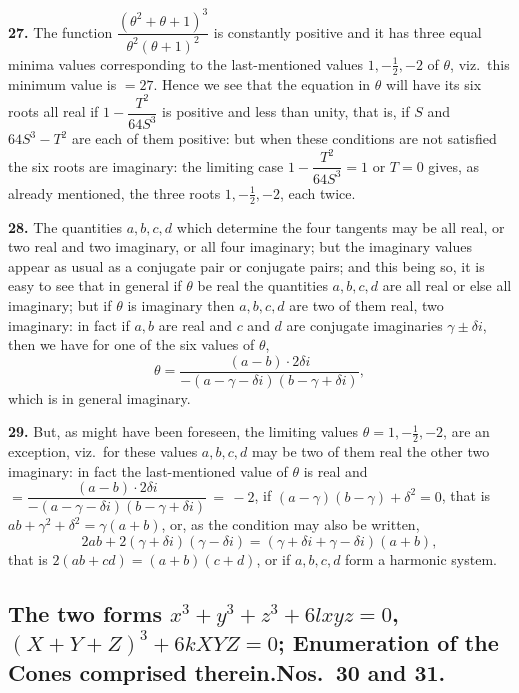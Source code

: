 \documentclass[11pt,a4paper]{article}
\begin{document}
\textbf{27.} The function $\dfrac{(\theta^{2} + \theta + 1)^{3}}{\theta^{2}(\theta + 1)^{2}}$ is constantly positive and it has three equal minima values corresponding to the last-mentioned values $1, -\tfrac{1}{2}, -2$ of $\theta$, viz.\ this minimum value is $= 27$. Hence we see that the equation in $\theta$ will have its six roots all real if $1 - \dfrac{T^{2}}{64S^{3}}$ is positive and less than unity, that is, if $S$ and $64S^{3} - T^{2}$ are each of them positive: but when these conditions are not satisfied the six roots are imaginary: the limiting case $1 - \dfrac{T^{2}}{64S^{3}} = 1$ or $T = 0$ gives, as already mentioned, the three roots $1, -\tfrac{1}{2}, -2$, each twice.

\textbf{28.} The quantities $a, b, c, d$ which determine the four tangents may be all real, or two real and two imaginary, or all four imaginary; but the imaginary values appear as usual as a conjugate pair or conjugate pairs; and this being so, it is easy to see that in general if $\theta$ be real the quantities $a, b, c, d$ are all real or else all imaginary; but if $\theta$ is imaginary then $a, b, c, d$ are two of them real, two imaginary: in fact if $a, b$ are real and $c$ and $d$ are conjugate imaginaries $\gamma \pm \delta i$, then we have for one of the six values of $\theta$,
\[
\theta = \frac{(a - b)\cdot 2\delta i}{-(a - \gamma - \delta i)(b - \gamma + \delta i)},
\]
which is in general imaginary.

\textbf{29.} But, as might have been foreseen, the limiting values $\theta = 1, -\tfrac{1}{2}, -2$, are an exception, viz.\ for these values $a, b, c, d$ may be two of them real the other two imaginary: in fact the last-mentioned value of $\theta$ is real and $= \dfrac{(a - b)\cdot 2\delta i}{-(a - \gamma - \delta i)(b - \gamma + \delta i)}\,=\,-2$, if $(a - \gamma)(b - \gamma) + \delta^{2} = 0$, that is $ab + \gamma^{2} + \delta^{2} = \gamma(a + b)$, or, as the condition may also be written,
\[
2ab + 2(\gamma + \delta i)(\gamma - \delta i) = (\gamma + \delta i + \gamma - \delta i)(a + b),
\]
that is $2(ab + cd) = (a + b)(c + d)$, or if $a, b, c, d$ form a harmonic system.

\subsection*{The two forms $x^{3} + y^{3} + z^{3} + 6lxyz = 0$, $(X + Y + Z)^{3} + 6kXYZ = 0$; Enumeration of the Cones comprised therein.\quad Nos.\ 30 and 31.}
\end{document}
